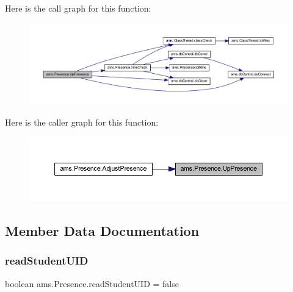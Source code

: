 Here is the call graph for this function\+:\nopagebreak
\begin{figure}[H]
\begin{center}
\leavevmode
\includegraphics[width=350pt]{classams_1_1_presence_af23602b98a9a3003ff240fd5cd133378_cgraph}
\end{center}
\end{figure}
Here is the caller graph for this function\+:\nopagebreak
\begin{figure}[H]
\begin{center}
\leavevmode
\includegraphics[width=350pt]{classams_1_1_presence_af23602b98a9a3003ff240fd5cd133378_icgraph}
\end{center}
\end{figure}


\subsection{Member Data Documentation}
\mbox{\label{classams_1_1_presence_a2f2f0c375628ca573e40201cfc514e17}} 
\subsubsection{\texorpdfstring{readStudentUID}{readStudentUID}}
{\footnotesize\ttfamily boolean ams.\+Presence.\+read\+Student\+U\+ID = false\hspace{0.3cm}{\ttfamily [static]}}

\mbox{\label{classams_1_1_presence_a7facdc9c46e28bbeafd2b6208b3de6b0}} 
